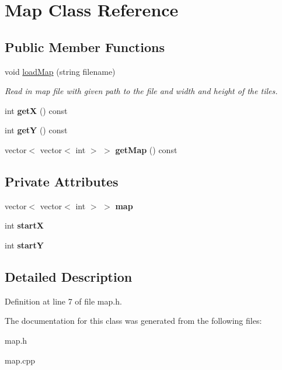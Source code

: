 \hypertarget{classMap}{}\section{Map Class Reference}
\label{classMap}
\subsection*{Public Member Functions}
\begin{DoxyCompactItemize}
\item 
void \hyperlink{classMap_a51e1c9c777bc6c4171707f1528a73dc6}{load\+Map} (string filename)\hypertarget{classMap_a51e1c9c777bc6c4171707f1528a73dc6}{}\label{classMap_a51e1c9c777bc6c4171707f1528a73dc6}

\begin{DoxyCompactList}\small\item\em Read in map file with given path to the file and width and height of the tiles. \end{DoxyCompactList}\item 
int {\bfseries getX} () const \hypertarget{classMap_ae235f91105c54961e42e2750cf52deaa}{}\label{classMap_ae235f91105c54961e42e2750cf52deaa}

\item 
int {\bfseries getY} () const \hypertarget{classMap_a7d9858d941f8e40226f4a12d4f8437c4}{}\label{classMap_a7d9858d941f8e40226f4a12d4f8437c4}

\item 
vector$<$ vector$<$ int $>$ $>$ {\bfseries get\+Map} () const \hypertarget{classMap_a4a48b8dda23e28e8db2a50eb1f24544d}{}\label{classMap_a4a48b8dda23e28e8db2a50eb1f24544d}

\end{DoxyCompactItemize}
\subsection*{Private Attributes}
\begin{DoxyCompactItemize}
\item 
vector$<$ vector$<$ int $>$ $>$ {\bfseries map}\hypertarget{classMap_ae7b21b2c3765bcd6a6c9dfe688108aa4}{}\label{classMap_ae7b21b2c3765bcd6a6c9dfe688108aa4}

\item 
int {\bfseries startX}\hypertarget{classMap_aec09a812761311faef72bd6aae7eb586}{}\label{classMap_aec09a812761311faef72bd6aae7eb586}

\item 
int {\bfseries startY}\hypertarget{classMap_a0d8a9a37385dbb4c831b61f72af82081}{}\label{classMap_a0d8a9a37385dbb4c831b61f72af82081}

\end{DoxyCompactItemize}


\subsection{Detailed Description}


Definition at line 7 of file map.\+h.



The documentation for this class was generated from the following files\+:\begin{DoxyCompactItemize}
\item 
map.\+h\item 
map.\+cpp\end{DoxyCompactItemize}
